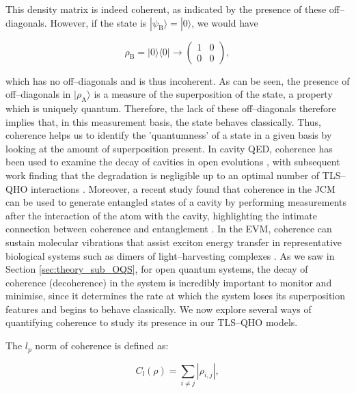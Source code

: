 \documentclass[11pt]{article}
\newcounter{subsubsubsection}[subsubsection]
\begin{document}
This density matrix is indeed coherent, as indicated by the presence of these off--diagonals. However, if the state is $|\psi_{\scriptscriptstyle \text{B}}\rangle = |0\rangle$, we would have

\begin{equation*}
    \rho_{\scriptscriptstyle \text{B}} = |0\rangle\langle0| \rightarrow 
    \begin{pmatrix}
        1 & 0 \\
        0 & 0
    \end{pmatrix},
\end{equation*}

which has no off--diagonals and is thus incoherent. As can be seen, the presence of off--diagonals in $|\rho_{\scriptscriptstyle \text{A}} \rangle$ is a measure of the superposition of the state, a property which is uniquely quantum. Therefore, the lack of these off--diagonals therefore implies that, in this measurement basis, the state behaves classically. Thus, coherence helps us to identify the 'quantumness' of a state in a given basis by looking at the amount of superposition present. In cavity QED, coherence has been used to examine the decay of cavities in open evolutions \cite{QResJCm2004-cQED_coherence}, with subsequent work finding that the degradation is negligible up to an optimal number of TLS--QHO interactions \cite{CohEnt2020-Cavity_controlled_coherence}. Moreover, a recent study found that coherence in the JCM can be used to generate entangled states of a cavity by performing measurements after the interaction of the atom with the cavity, highlighting the intimate connection between coherence and entanglement \cite{CohEnt2024-2_JCM_coherence}. In the EVM, coherence can  sustain molecular vibrations that assist exciton energy transfer in representative biological systems such as dimers of light--harvesting complexes \cite{ExVib2014-Alexandra}. As we saw in Section \ref{sec:theory_sub_OQS}, for open quantum systems, the decay of coherence (decoherence) in the system is incredibly important to monitor and minimise,  since it determines the rate at which the system loses its superposition features and begins to behave classically. We now explore several ways of quantifying coherence to study its presence in our TLS--QHO models. 


The $l_p$ norm of coherence is defined as:

\begin{equation}
    C_l(\rho) = \sum_{i\neq j} |\rho_{i,j}|, 
\end{equation}
\end{document}
